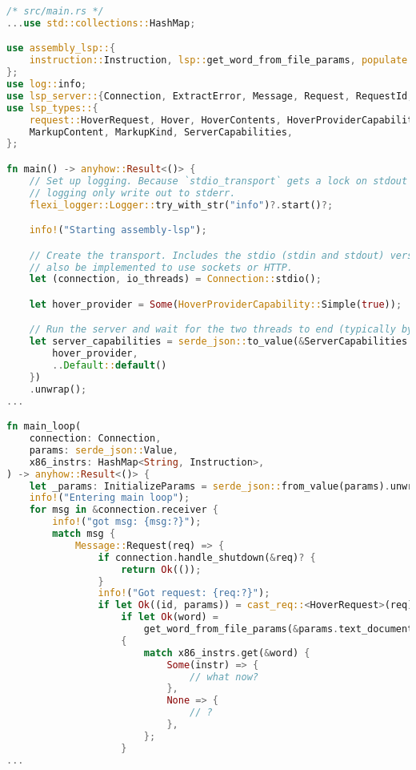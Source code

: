 \begin{lstlisting}[language=rust]
/* src/main.rs */
...use std::collections::HashMap;

use assembly_lsp::{
    instruction::Instruction, lsp::get_word_from_file_params, populate::populate_instructions,
};
use log::info;
use lsp_server::{Connection, ExtractError, Message, Request, RequestId, Response};
use lsp_types::{
    request::HoverRequest, Hover, HoverContents, HoverProviderCapability, InitializeParams,
    MarkupContent, MarkupKind, ServerCapabilities,
};

fn main() -> anyhow::Result<()> {
    // Set up logging. Because `stdio_transport` gets a lock on stdout and stdin, we must have our
    // logging only write out to stderr.
    flexi_logger::Logger::try_with_str("info")?.start()?;

    info!("Starting assembly-lsp");

    // Create the transport. Includes the stdio (stdin and stdout) versions but this could
    // also be implemented to use sockets or HTTP.
    let (connection, io_threads) = Connection::stdio();

    let hover_provider = Some(HoverProviderCapability::Simple(true));

    // Run the server and wait for the two threads to end (typically by trigger LSP Exit event).
    let server_capabilities = serde_json::to_value(&ServerCapabilities {
        hover_provider,
        ..Default::default()
    })
    .unwrap();
...

fn main_loop(
    connection: Connection,
    params: serde_json::Value,
    x86_instrs: HashMap<String, Instruction>,
) -> anyhow::Result<()> {
    let _params: InitializeParams = serde_json::from_value(params).unwrap();
    info!("Entering main loop");
    for msg in &connection.receiver {
        info!("got msg: {msg:?}");
        match msg {
            Message::Request(req) => {
                if connection.handle_shutdown(&req)? {
                    return Ok(());
                }
                info!("Got request: {req:?}");
                if let Ok((id, params)) = cast_req::<HoverRequest>(req) {
                    if let Ok(word) =
                        get_word_from_file_params(&params.text_document_position_params)
                    {
                        match x86_instrs.get(&word) {
                            Some(instr) => {
                                // what now?
                            },
                            None => {
                                // ?
                            },
                        };
                    }
...
\end{lstlisting}


